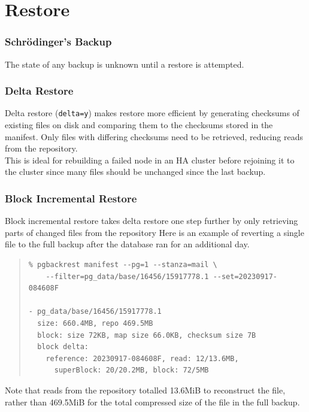 \section{Restore}

\begin{frame}[fragile]
    \frametitle{Schr\"{o}dinger's Backup}

    \Large The state of any backup is unknown until a restore is attempted.
\end{frame}

\begin{frame}[fragile]
    \frametitle{Delta Restore}

    Delta restore (\texttt{delta=y}) makes restore more efficient by generating checksums of existing files on disk and comparing them to the checksums stored in the manifest. Only files with differing checksums need to be retrieved, reducing reads from the repository.
    \\\vspace{1em}
    This is ideal for rebuilding a failed node in an HA cluster before rejoining it to the cluster since many files should be unchanged since the last backup.
\end{frame}

\begin{frame}[fragile]
    \frametitle{Block Incremental Restore}

    Block incremental restore takes delta restore one step further by only retrieving parts of changed files from the repository Here is an example of reverting a single file to the full backup after the database ran for an additional day.
    \\\vspace{1em}

    \begin{quote}\begin{verbatim}
% pgbackrest manifest --pg=1 --stanza=mail \
    --filter=pg_data/base/16456/15917778.1 --set=20230917-084608F

- pg_data/base/16456/15917778.1
  size: 660.4MB, repo 469.5MB
  block: size 72KB, map size 66.0KB, checksum size 7B
  block delta:
    reference: 20230917-084608F, read: 12/13.6MB,
      superBlock: 20/20.2MB, block: 72/5MB
    \end{verbatim}\end{quote}\vspace{-1em}

    Note that reads from the repository totalled 13.6MiB to reconstruct the file, rather than 469.5MiB for the total compressed size of the file in the full backup.
\end{frame}


